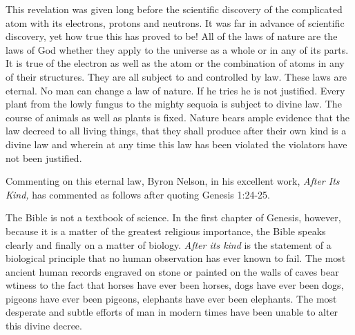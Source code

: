 This revelation was given long before the scientific discovery of the complicated atom with
its electrons, protons and neutrons. It was far in advance of scientific discovery, yet how true
this has proved to be! All of the laws of nature are the laws of God whether they apply to the
universe as a whole or in any of its parts. It is true of the electron as well as the atom or the
combination of atoms in any of their structures. They are all subject to and controlled by law.
These laws are eternal. No man can change a law of nature. If he tries he is not justified.
Every plant from the lowly fungus to the mighty sequoia is subject to divine law. The course
of animals as well as plants is fixed. Nature bears ample evidence that the law decreed to all
living things, that they shall produce after their own kind is a divine law and wherein at any
time this law has been violated the violators have not been justified.

Commenting on this eternal law, Byron Nelson, in his excellent work, \textit{After Its Kind,} has
commented as follows after quoting Genesis 1:24-25.

The Bible is not a textbook of science. In the first chapter of Genesis, however, because it is
a matter of the greatest religious importance, the Bible speaks clearly and finally on a matter
of biology. \textit{After its kind} is the statement of a biological principle that no human observation
has ever known to fail. The most ancient human records engraved on stone or painted on the
walls of caves bear wtiness to the fact that horses have ever been horses, dogs have ever been
dogs, pigeons have ever been pigeons, elephants have ever been elephants. The most
desperate and subtle efforts of man in modern times have been unable to alter this divine
decree.

